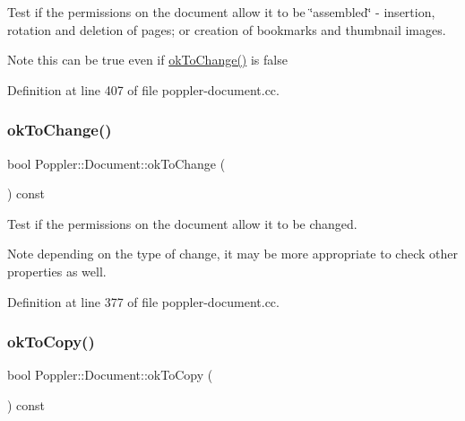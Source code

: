 Test if the permissions on the document allow it to be \char`\"{}assembled\char`\"{} -\/ insertion, rotation and deletion of pages; or creation of bookmarks and thumbnail images.

\begin{DoxyNote}{Note}
this can be true even if \hyperlink{class_poppler_1_1_document_a0d779137e2bd544a1b1cb6251770f544}{ok\+To\+Change()} is false 
\end{DoxyNote}


Definition at line 407 of file poppler-\/document.\+cc.

\mbox{\label{class_poppler_1_1_document_a0d779137e2bd544a1b1cb6251770f544}} 
\subsubsection{\texorpdfstring{ok\+To\+Change()}{okToChange()}}
{\footnotesize\ttfamily bool Poppler\+::\+Document\+::ok\+To\+Change (\begin{DoxyParamCaption}{ }\end{DoxyParamCaption}) const}

Test if the permissions on the document allow it to be changed.

\begin{DoxyNote}{Note}
depending on the type of change, it may be more appropriate to check other properties as well. 
\end{DoxyNote}


Definition at line 377 of file poppler-\/document.\+cc.

\mbox{\label{class_poppler_1_1_document_a22090fb7613d582f4e3327f55bc6e5b4}} 
\subsubsection{\texorpdfstring{ok\+To\+Copy()}{okToCopy()}}
{\footnotesize\ttfamily bool Poppler\+::\+Document\+::ok\+To\+Copy (\begin{DoxyParamCaption}{ }\end{DoxyParamCaption}) const}

